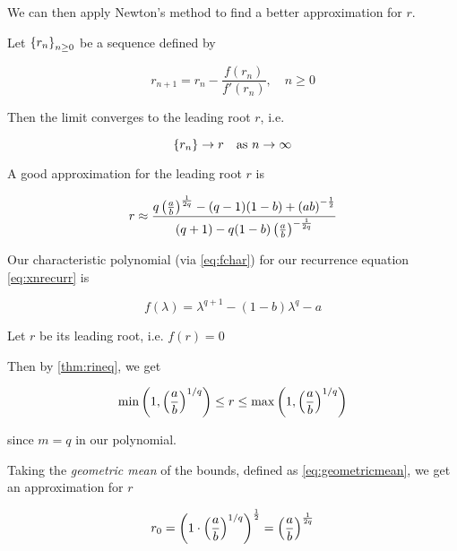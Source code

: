 We can then apply Newton's method \cite{EncyMathNewton} to find a better approximation for $r$.

\begin{definition}
Let $\left\{r_n\right\}_{n\geq0}$ be a sequence defined by

\begin{equation}\label{eq:newtoneq}
r_{n+1} = r_n - \frac{f(r_n)}{f'(r_n)}, \quad n\geq0
\end{equation}

Then the limit converges to the leading root $r$, i.e.

\begin{equation}
\left\{r_n\right\} \to r \quad \text{as } n\to\infty
\end{equation}
\end{definition}

\begin{result}\label{thm:rapprox}
A good approximation for the leading root $r$ is 

\begin{equation} \label{eq:req1}
r\approx  \frac{q\left(\frac{a}{b}\right)^{\frac{1}{2q}} - (q-1)(1-b) + \left(ab\right)^{-\frac12}}{(q+1) - q(1-b)\left(\frac{a}{b}\right)^{-\frac{1}{2q}}}
\end{equation}

\begin{pf}
Our characteristic polynomial (via \eqref{eq:fchar}) for our recurrence equation \eqref{eq:xnrecurr} is

\begin{equation} \label{eq:fchar1}
f(\lambda) = \lambda^{q+1} - (1-b)\lambda^q - a
\end{equation}

Let $r$ be its leading root, i.e. $f(r)=0$ 

Then by \ref{thm:rineq}, we get 

\begin{equation}
 \min\left(1,\left(\frac{a}{b}\right)^{1/q}\right)\leq r \leq \max\left(1,\left(\frac{a}{b}\right)^{1/q}\right)
\end{equation}

since $m=q$ in our polynomial.

Taking the \textit{geometric mean} of the bounds, defined as \eqref{eq:geometricmean}, we get an approximation for $r$

\begin{equation}\label{eq:rapprox0}
r_0 = \left(1\cdot \left(\frac{a}{b}\right)^{1/q}\right)^{\frac12}= \left(\frac{a}{b}\right)^{\frac1{2q}}
\end{equation}


\end{pf}
\end{result}
